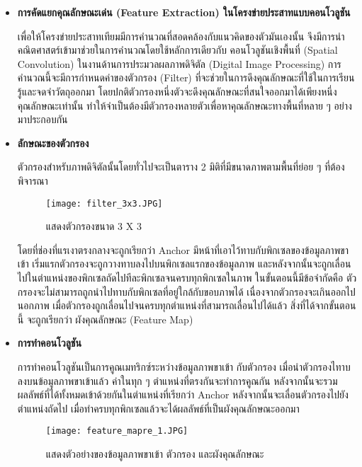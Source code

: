 \begin{itemize}

    \item \textbf{การคัดแยกคุณลักษณะเด่น (Feature Extraction) ในโครงข่ายประสาทแบบคอนโวลูชัน} \par
    
    เพื่อให้โครงข่ายประสาทเทียมมีการคำนวณที่สอดคล้องกับแนวคิดของตัวมันเองนั้น 
    จึงมีการนำคณิตศาสตร์เข้ามาช่วยในการคำนวณโดยใช้หลักการเดียวกับ คอนโวลูชันเชิงพื้นที่ (Spatial Convolution) 
    ในงานด้านการประมวลผลภาพดิจิตัล (Digital Image Processing) การคำนวณนี้จะมีการกำหนดค่าของตัวกรอง (Filter) ที่จะช่วยในการดึงคุณลักษณะที่ใช้ในการเรียนรู้และจดจำวัตถุออกมา
    โดยปกติตัวกรองหนึ่งตัวจะดึงคุณลักษณะที่สนใจออกมาได้เพียงหนึ่งคุณลักษณะเท่านั้น ทำให้จำเป็นต้องมีตัวกรองหลายตัวเพื่อหาคุณลักษณะทางพื้นที่หลาย ๆ อย่างมาประกอบกัน
    
    \item \textbf{ลักษณะของตัวกรอง} \par
    
    ตัวกรองสำหรับภาพดิจิตัลนั้นโดยทั่วไปจะเป็นตาราง 2 มิติที่มีขนาดภาพตามพื้นที่ย่อย ๆ ที่ต้องพิจารณา

    \begin{figure}[h]
        \centering
        \texttt{[image: filter\_3x3.JPG]}
        \caption{แสดงตัวกรองขนาด 3 X 3}
        \label{Fig:filter_3X3}
    \end{figure}

    โดยที่ช่องที่แรเงาตรงกลางจะถูกเรียกว่า Anchor มีหน้าที่เอาไว้ทาบกับพิกเซลของข้อมูลภาพขาเข้า 
    เริ่มแรกตัวกรองจะถูกวางทาบลงไปบนพิกเซลแรกของข้อมูลภาพ และหลังจากนั้นจะถูกเลื่อนไปในตำแหน่งของพิกเซลถัดไปทีละพิกเซลจนครบทุกพิกเซลในภาพ
    ในขั้นตอนนี้มีข้อจำกัดคือ ตัวกรองจะไม่สามารถถูกนำไปทาบกับพิกเซลที่อยู่ใกล้กับขอบภาพได้ เนื่องจากตัวกรองจะเกินออกไปนอกภาพ เมื่อตัวกรองถูกเลื่อนไปจนครบทุกตำแหน่งที่สามารถเลื่อนไปได้แล้ว สิ่งที่ได้จากขั้นตอนนี้ จะถูกเรียกว่า 
    ผังคุณลักษณะ (Feature Map)

    \item \textbf{การทำคอนโวลูชัน} \par
    
    การทำคอนโวลูชันเป็นการคูณเมทริกซ์ระหว่างข้อมูลภาพขาเข้า กับตัวกรอง เมื่อนำตัวกรองไทาบลงบนข้อมูลภาพขาเข้าแล้ว ค่าในทุก ๆ 
    ตำแหน่งที่ตรงกันจะทำการคูณกัน หลังจากนั้นจะรวมผลลัพธ์ที่ได้ทั้งหมดเข้าด้วยกันในตำแหน่งที่เรียกว่า Anchor หลังจากนั้นจะเลื่อนตัวกรองไปยังตำแหน่งถัดไป 
    เมื่อทำครบทุกพิกเซลแล้วจะได้ผลลัพธ์ที่เป็นผังคุณลักษณะออกมา
    
    \begin{figure}[h]
        \centering
        \texttt{[image: feature\_mapre\_1.JPG]}
        \caption{แสดงตัวอย่างของข้อมูลภาพขาเข้า ตัวกรอง และผังคุณลักษณะ}
        \label{Fig:input_fil_feature}
    \end{figure}


\end{itemize}

